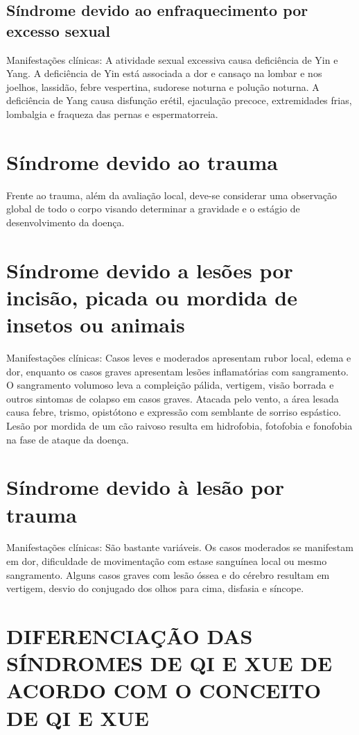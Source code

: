 \documentclass[12pt,oneside,a4paper]{book} %
\begin{document}
\section{Síndrome devido ao enfraquecimento por excesso sexual} 
Manifestações clínicas: A atividade sexual excessiva causa deficiência de Yin e Yang. A deficiência de Yin está associada a dor e cansaço na lombar e nos joelhos, lassidão, febre vespertina, sudorese noturna e polução noturna. A deficiência de Yang causa disfunção erétil, ejaculação precoce, extremidades frias, lombalgia e fraqueza das pernas e espermatorreia.

\chapter{Síndrome devido ao trauma}

Frente ao trauma, além da avaliação local, deve-se considerar uma observação global de todo o corpo visando determinar a gravidade e o estágio de desenvolvimento da doença.

\chapter{Síndrome devido a lesões por incisão, picada ou mordida de insetos ou animais}
Manifestações clínicas: Casos leves e moderados apresentam rubor local, edema e dor, enquanto os casos graves apresentam lesões inflamatórias com sangramento. O sangramento volumoso leva a compleição pálida, vertigem, visão borrada e outros sintomas de colapso em casos graves. Atacada pelo vento, a área lesada causa febre, trismo, opistótono e expressão com semblante de sorriso espástico. Lesão por mordida de um cão raivoso resulta em hidrofobia, fotofobia e fonofobia na fase de ataque da doença.

\chapter{Síndrome devido à lesão por trauma}
Manifestações clínicas: São bastante variáveis. Os casos moderados se manifestam em dor, dificuldade de movimentação com estase sanguínea local ou mesmo sangramento. Alguns casos graves com lesão óssea e do cérebro resultam em vertigem, desvio do conjugado dos olhos para cima, disfasia e síncope.

\chapter{DIFERENCIAÇÃO DAS SÍNDROMES DE QI E XUE DE ACORDO COM O CONCEITO DE QI E XUE} 
\end{document}
